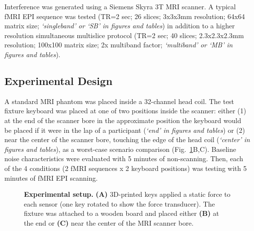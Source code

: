 \documentclass[letterpaper, 10 pt, conference]{ieeeconf}  %
\begin{document}
Interference was generated using a Siemens Skyra 3T MRI scanner. A typical fMRI EPI sequence was tested (TR=2 sec; 26 slices; 3x3x3mm resolution; 64x64 matrix size; \textit{`singleband' or `SB' in figures and tables}) in addition to a higher resolution simultaneous multislice protocol (TR=2 sec; 40 slices; 2.3x2.3x2.3mm resolution; 100x100 matrix size; 2x multiband factor; \textit{`multiband' or `MB' in figures and tables}).

\subsection{Experimental Design}

A standard MRI phantom was placed inside a 32-channel head coil. The test fixture keyboard was placed at one of two positions inside the scanner: either (1) at the end of the scanner bore in the approximate position the keyboard would be placed if it were in the lap of a participant (\textit{`end' in figures and tables}) or (2) near the center of the scanner bore, touching the edge of the head coil (\textit{`center' in figures and tables}), as a worst-case scenario comparison (Fig.\ \ref{fig:setup}B,C). Baseline noise characteristics were evaluated with 5 minutes of non-scanning. Then, each of the 4 conditions (2 fMRI sequences x 2 keyboard positions) was testing with 5 minutes of fMRI EPI scanning.


\begin{figure}[thpb]
  \centering
  \caption{\textbf{Experimental setup.} \textbf{(A)} 3D-printed keys applied a static force to each sensor (one key rotated to show the force transducer). The fixture was attached to a wooden board and placed either \textbf{(B)} at the end or \textbf{(C)} near the center of the MRI scanner bore.}
  \label{fig:setup}
\end{figure}
\end{document}
